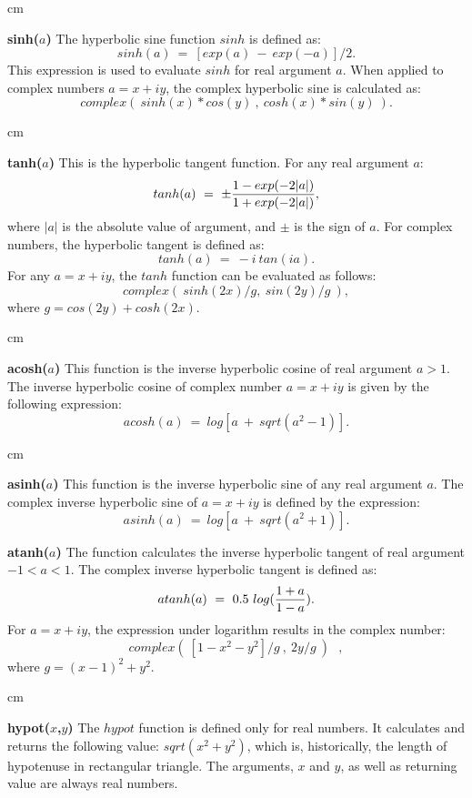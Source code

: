  cm

{\bf sinh($a$)}\hfil\break
The hyperbolic sine function $sinh$ is defined as:
$$sinh(a)\ =\ [exp(a)\ -\ exp(-a)]/2 .$$
This expression is used to evaluate $sinh$ for real argument $a$.
When applied to complex numbers $a=x+iy$, the complex hyperbolic sine 
is calculated as:
$$complex(\
sinh(x)*cos(y)\ ,\ cosh(x)*sin(y)\
) .$$

 cm

{\bf tanh($a$)}\hfil\break
This is the hyperbolic tangent function.
For any real argument $a$:
$$tanh(a)\ =\ \pm {{1 - exp(-2|a|) } \over {1 + exp(-2|a|)} } ,$$
where $|a|$ is the absolute value of argument, and $\pm$ is the sign of $a$.
For complex numbers, the hyperbolic tangent is defined as:
$$tanh(a)\ =\ -i\ tan(ia) .$$
For any $a=x+iy$, the $tanh$ function can be evaluated as follows:
$$complex(\ sinh(2x)/g ,\ sin(2y)/g\ ) ,$$
where $g=cos(2y)+cosh(2x)$.

 cm

{\bf acosh($a$)}\hfil\break
This function is the inverse hyperbolic cosine
of real argument $a>1$.
The inverse hyperbolic cosine of complex number $a=x+iy$
is given by the following expression:
$$acosh(a)\ =\ log [a\ +\ sqrt(a^2 - 1)] .$$

 cm

{\bf asinh($a$)}\hfil\break
This function is the inverse hyperbolic sine
of any real argument $a$.
The complex inverse hyperbolic sine of $a=x+iy$
is defined by the expression:
$$asinh(a)\ =\ log [a\ +\ sqrt(a^2 + 1)] .$$

\newpage

{\bf atanh($a$)}\hfil\break
The function calculates the inverse hyperbolic tangent 
of real argument $-1 < a < 1$.
The complex inverse hyperbolic tangent is defined as:
$$atanh(a)\ =\ 0.5\ log ( { {1+a} \over {1-a} }) .$$
For $a=x+iy$, the expression under logarithm results in
the complex number:
$$complex(\ [1-x^2-y^2]/g\ ,\ 2y/g\ ) ~~~,$$
where $g = (x-1)^2 + y^2$.

 cm

{\bf hypot($x$,$y$)}\hfil\break
The $hypot$ function is defined only for real numbers.
It calculates and returns the following value: $sqrt(x^2+y^2)$,
which is, historically, the length of hypotenuse in
rectangular triangle.
The arguments, $x$ and $y$, as well as returning value
are always real numbers.



